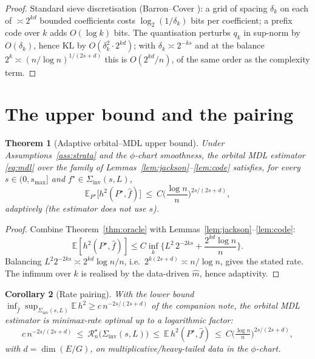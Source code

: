 \documentclass[11pt]{article}
\theoremstyle{plain}
\newtheorem{theorem}{Theorem}[section]
\newtheorem{corollary}[theorem]{Corollary}
\theoremstyle{definition}
\theoremstyle{remark}
\newcommand{\E}{\mathbb{E}}
\newcommand{\KL}{\mathrm{KL}}
\DeclareMathOperator{\dimm}{dim}
\begin{document}
\begin{proof}
Standard sieve discretisation (Barron--Cover \cite{barroncover}): a grid of
spacing $\delta_k$ on each of $\asymp2^{kd}$ bounded coefficients costs
$\log_2(1/\delta_k)$ bits per coefficient; a prefix code over $k$ adds $O(\log k)$
bits. The quantisation perturbs $q_k$ in sup-norm by $O(\delta_k)$, hence $\KL$ by
$O(\delta_k^2\cdot2^{kd})$; with $\delta_k\asymp 2^{-ks}$ and at the balance
$2^{k}\asymp(n/\log n)^{1/(2s+d)}$ this is $O(2^{kd}/n)$, of the same order as the
complexity term.
\end{proof}

\section{The upper bound and the pairing}

\begin{theorem}[Adaptive orbital--MDL upper bound]\label{thm:upper}
Under Assumptions~\ref{ass:strata} and the $\phi$-chart smoothness, the orbital
MDL estimator \eqref{eq:mdl} over the family of Lemmas~\ref{lem:jackson}--\ref{lem:code}
satisfies, for every $s\in(0,s_{\max}]$ and $f^\star\in\Sigma_{\mathrm{inv}}(s,L)$,
\[
\E_{P^\star}\big[h^2(P^\star,\widehat f)\big]
\ \le\ C\Big(\frac{\log n}{n}\Big)^{2s/(2s+d)},
\]
\emph{adaptively} (the estimator does not use $s$).
\end{theorem}

\begin{proof}
Combine Theorem~\ref{thm:oracle} with Lemmas~\ref{lem:jackson}--\ref{lem:code}:
\[
\E[h^2(P^\star,\widehat f)]
\le C\inf_{k}\Big\{L^2\,2^{-2ks}+\frac{2^{kd}\log n}{n}\Big\}.
\]
Balancing $L^2 2^{-2ks}\asymp 2^{kd}\log n/n$, i.e.\
$2^{k(2s+d)}\asymp n/\log n$, gives the stated rate. The infimum over $k$ is
realised by the data-driven $\widehat m$, hence adaptivity.
\end{proof}

\begin{corollary}[Rate pairing]\label{cor:pairing}
With the lower bound $\inf_{\widehat f}\sup_{\Sigma_{\mathrm{inv}}(s,L)}\E\,h^2\ge
c\,n^{-2s/(2s+d)}$ of the companion note, the orbital MDL estimator is
\emph{minimax-rate optimal up to a logarithmic factor}:
\[
c\,n^{-2s/(2s+d)}\ \le\ \mathcal R_n^\star\big(\Sigma_{\mathrm{inv}}(s,L)\big)
\ \le\ \E\,h^2(P^\star,\widehat f)\ \le\ C\Big(\tfrac{\log n}{n}\Big)^{2s/(2s+d)},
\]
with $d=\dimm(E/G)$, on multiplicative/heavy-tailed data in the $\phi$-chart.
\end{corollary}
\end{document}
